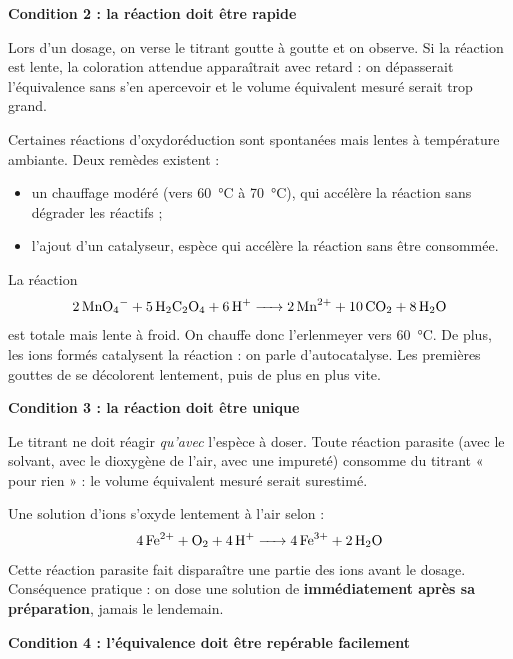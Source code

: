 \documentclass[11pt]{article}
\newcommand{\cle}[1]{{\popxbold\color{popdark}#1}}
\begin{document}
\textbf{Condition 2 : la réaction doit être rapide}\par

Lors d'un dosage, on verse le titrant goutte à goutte et on observe. Si la réaction est lente, la coloration attendue apparaîtrait avec retard : on dépasserait l'équivalence sans s'en apercevoir et le volume équivalent mesuré serait trop grand.

Certaines réactions d'oxydoréduction sont spontanées mais lentes à température ambiante. Deux remèdes existent :
\begin{itemize}
\item un \cle{chauffage modéré} (vers \SI{60}{\celsius} à \SI{70}{\celsius}), qui accélère la réaction sans dégrader les réactifs ;
\item l'ajout d'un \cle{catalyseur}, espèce qui accélère la réaction sans être consommée.
\end{itemize}

\begin{exemplebox}
La réaction
\[ \ce{2MnO4^- + 5H2C2O4 + 6H+ -> 2Mn^2+ + 10CO2 + 8H2O} \]
est totale mais lente à froid. On chauffe donc l'erlenmeyer vers \SI{60}{\celsius}. De plus, les ions  formés catalysent la réaction : on parle d'\cle{autocatalyse}. Les premières gouttes de  se décolorent lentement, puis de plus en plus vite.
\end{exemplebox}

\textbf{Condition 3 : la réaction doit être unique}\par

Le titrant ne doit réagir \emph{qu'avec} l'espèce à doser. Toute \cle{réaction parasite} (avec le solvant, avec le dioxygène de l'air, avec une impureté) consomme du titrant « pour rien » : le volume équivalent mesuré serait surestimé.

\begin{attention}
Une solution d'ions  s'oxyde lentement à l'air selon :
\[ \ce{4Fe^2+ + O2 + 4H+ -> 4Fe^3+ + 2H2O} \]
Cette réaction parasite fait disparaître une partie des ions  avant le dosage. Conséquence pratique : on dose une solution de  \textbf{immédiatement après sa préparation}, jamais le lendemain.
\end{attention}

\textbf{Condition 4 : l'équivalence doit être repérable facilement}\par
\end{document}
